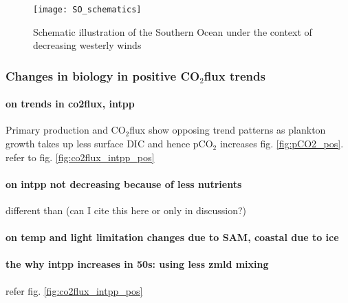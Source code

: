 \documentclass[12pt]{article}
\begin{document}
\begin{figure}[h!]
	\centering
\texttt{[image: SO\_schematics]}
	\caption{Schematic illustration of the Southern Ocean under the context of decreasing westerly winds}
	\label{fig:schematics_weaker_winds}
\end{figure}



\clearpage

\subsubsection{Changes in biology in positive CO$_2$flux trends}

\paragraph{on trends in co2flux, intpp} Primary production and CO$_2$flux show opposing trend patterns as plankton growth takes up less surface DIC and hence pCO$_2$ increases fig. \ref{fig:pCO2_pos}. refer to fig. \ref{fig:co2flux_intpp_pos} 


\paragraph{on intpp not decreasing because of less nutrients}  different than \citep{Lovenduski2005} (can I cite this here or only in discussion?)

\paragraph{on temp and light limitation changes due to SAM, coastal due to ice}

\paragraph{the why intpp increases in 50s: using less zmld mixing} refer fig. \ref{fig:co2flux_intpp_pos}
\end{document}
